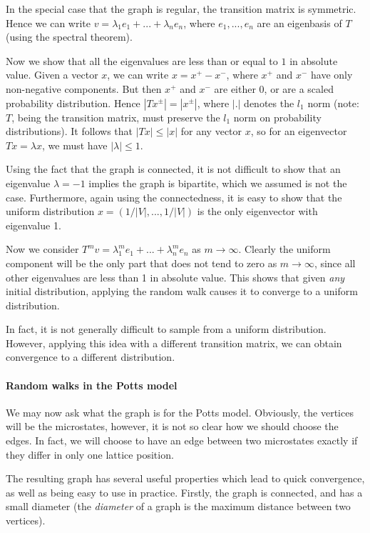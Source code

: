 \documentclass{article}
\begin{document}
In the special case that the graph is regular, the transition matrix is symmetric.
Hence we can write $v = \lambda_1e_1 + ... + \lambda_ne_n$, where $e_1, ..., e_n$ are an eigenbasis of $T$ (using the spectral theorem).

Now we show that all the eigenvalues are less than or equal to $1$ in absolute value.
Given a vector $x$, we can write $x = x^+ - x^-$, where $x^+$ and $x^-$ have only non-negative components.
But then $x^+$ and $x^-$ are either 0, or are a scaled probability distribution.
Hence $|Tx^\pm| = |x^\pm|$, where $|.|$ denotes the $l_1$ norm (note: $T$, being the transition matrix, must preserve the $l_1$ norm on probability distributions).
It follows that $|Tx| \leq |x|$ for any vector $x$, so for an eigenvector $Tx = \lambda x$, we must have $|\lambda| \leq 1$.

Using the fact that the graph is connected, it is not difficult to show that an eigenvalue $\lambda = -1$ implies the graph is bipartite, which we assumed is not the case.
Furthermore, again using the connectedness, it is easy to show that the uniform distribution $x = (1/|V|, ..., 1/|V|)$ is the only eigenvector with eigenvalue 1.

Now we consider $T^mv = \lambda_1^me_1 + ... + \lambda_n^me_n$ as $m\rightarrow\infty$.
Clearly the uniform component will be the only part that does not tend to zero as $m\rightarrow\infty$, since all other eigenvalues are less than 1 in absolute value.
This shows that given \emph{any} initial distribution, applying the random walk causes it to converge to a uniform distribution.

In fact, it is not generally difficult to sample from a uniform distribution.
However, applying this idea with a different transition matrix, we can obtain convergence to a different distribution.

\paragraph{Random walks in the Potts model}
We may now ask what the graph is for the Potts model.
Obviously, the vertices will be the microstates, however, it is not so clear how we should choose the edges.
In fact, we will choose to have an edge between two microstates exactly if they differ in only one lattice position.

The resulting graph has several useful properties which lead to quick convergence, as well as being easy to use in practice.
Firstly, the graph is connected, and has a small diameter (the \emph{diameter} of a graph is the maximum distance between two vertices).
\end{document}
